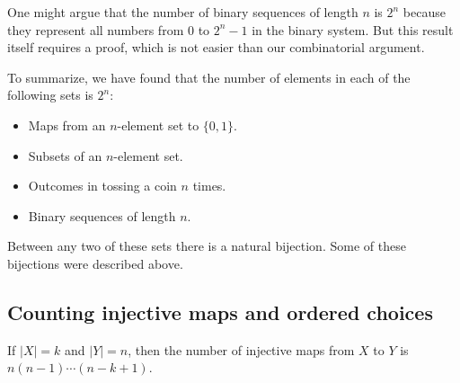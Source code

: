 \begin{page}

\begin{rem}
One might argue that the number of binary sequences of length $n$ is $2^n$ because they represent all numbers from $0$ to $2^n - 1$ in the binary system.
But this result itself requires a proof, which is not easier than our combinatorial argument.
\end{rem}

\end{page}

\begin{page}


To summarize, we have found that the number of elements in each of the following sets is $2^n$:
\begin{itemize}
\item
Maps from an $n$-element set to $\{0,1\}$.
\item
Subsets of an $n$-element set.
\item
Outcomes in tossing a coin $n$ times.
\item
Binary sequences of length $n$.
\end{itemize}

Between any two of these sets there is a natural bijection.
Some of these bijections were described above.



\end{page}

\begin{page}

\subsection{Counting injective maps and ordered choices}

\end{page}

\begin{page}

\begin{thm}
If $|X|=k$ and $|Y|=n$, then the number of injective maps from $X$ to $Y$ is $n(n-1) \cdots (n-k+1)$.
\end{thm}

\end{page}

